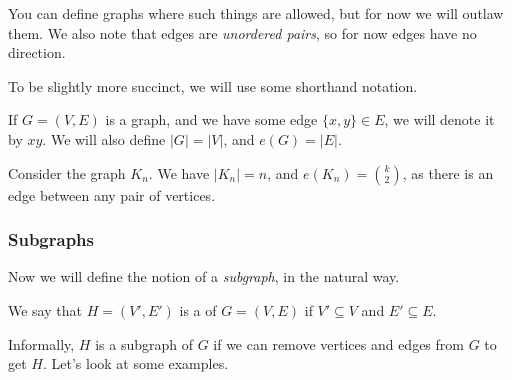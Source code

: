\begin{remark}
\begin{center}

	\end{center}
	 You can define graphs where such things are allowed, but for now we will outlaw them. We also note that edges are \emph{unordered pairs}, so for now edges have no direction.
\end{remark}

To be slightly more succinct, we will use some shorthand notation. 

\begin{notation}
If $G = (V, E)$ is a graph, and we have some edge $\{x, y\} \in E$, we will denote it by $xy$. We will also define $|G| = |V|$, and $e(G) = |E|$.
\end{notation}
 
\begin{example}
	Consider the graph $K_n$. We have $|K_n| = n$, and $e(K_n) = \binom{k}{2}$, as there is an edge between any pair of vertices.
\end{example}

\subsubsection{Subgraphs}

Now we will define the notion of a \emph{subgraph}, in the natural way.

\begin{definition}[Subgraph]
	We say that $H= (V', E')$ is a  of $G = (V, E)$ if $V' \subseteq V$ and $E' \subseteq E$.
\end{definition}

Informally, $H$ is a subgraph of $G$ if we can remove vertices and edges from $G$ to get $H$. Let's look at some examples.

